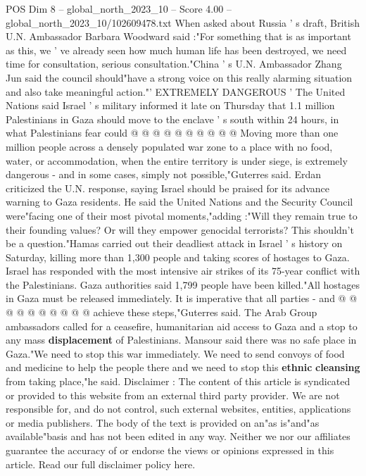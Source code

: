 \begin{textsample}{POS Dim 8 – global\_north\_2023\_10 – Score 4.00 – global\_north\_2023\_10/102609478.txt}
When asked about Russia ' s draft, British U.N.
Ambassador Barbara Woodward said :"For something that is as important as this, we ' ve already seen how much human life has been destroyed, we need time for consultation, serious consultation."China ' s U.N.
Ambassador Zhang Jun said the council should"have a strong voice on this really alarming situation and also take meaningful action."' EXTREMELY DANGEROUS ' The United Nations said Israel ' s military informed it late on Thursday that 1.1 million Palestinians in Gaza should move to the enclave ' s south within 24 hours, in what Palestinians fear could @ @ @ @ @ @ @ @ @ @ Moving more than one million people across a densely populated war zone to a place with no food, water, or accommodation, when the entire territory is under siege, is extremely dangerous - and in some cases, simply not possible,"Guterres said.
Erdan criticized the U.N. response, saying Israel should be praised for its advance warning to Gaza residents.
He said the United Nations and the Security Council were"facing one of their most pivotal moments,"adding :"Will they remain true to their founding values?
Or will they empower genocidal terrorists?
This shouldn't be a question."Hamas carried out their deadliest attack in Israel ' s history on Saturday, killing more than 1,300 people and taking scores of hostages to Gaza.
Israel has responded with the most intensive air strikes of its 75-year conflict with the Palestinians.
Gaza authorities said 1,799 people have been killed."All hostages in Gaza must be released immediately.
It is imperative that all parties - and @ @ @ @ @ @ @ @ @ @ achieve these steps,"Guterres said.
The Arab Group ambassadors called for a ceasefire, humanitarian aid access to Gaza and a stop to any mass \textbf{displacement} of Palestinians.
Mansour said there was no safe place in Gaza."We need to stop this war immediately.
We need to send convoys of food and medicine to help the people there and we need to stop this \textbf{ethnic} \textbf{cleansing} from taking place,"he said.
Disclaimer : The content of this article is syndicated or provided to this website from an external third party provider.
We are not responsible for, and do not control, such external websites, entities, applications or media publishers.
The body of the text is provided on an"as is"and"as available"basis and has not been edited in any way.
Neither we nor our affiliates guarantee the accuracy of or endorse the views or opinions expressed in this article.
Read our full disclaimer policy here.

\end{textsample}
